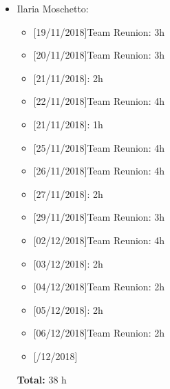 \begin{itemize}
\item Ilaria Moschetto: 
\begin{itemize}
    \item {[}19/11/2018{]}Team Reunion: 3h
    \item {[}20/11/2018{]}Team Reunion: 3h
    \item {[}21/11/2018{]}: 2h
    \item {[}22/11/2018{]}Team Reunion: 4h
    \item {[}21/11/2018{]}: 1h
    \item {[}25/11/2018{]}Team Reunion: 4h
    \item {[}26/11/2018{]}Team Reunion: 4h
    \item {[}27/11/2018{]}: 2h
    \item {[}29/11/2018{]}Team Reunion: 3h
    \item {[}02/12/2018{]}Team Reunion: 4h
    \item {[}03/12/2018{]}: 2h
    \item {[}04/12/2018{]}Team Reunion: 2h
    \item {[}05/12/2018{]}: 2h
    \item {[}06/12/2018{]}Team Reunion: 2h
    \item {[}/12/2018{]}
\end{itemize}

\textbf{Total:} 38 h
\end{itemize}